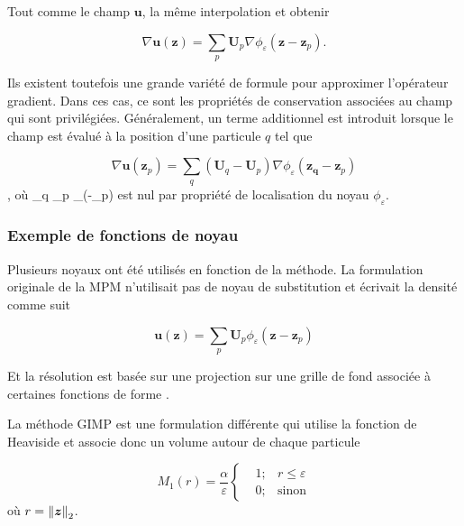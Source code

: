 Tout comme le champ $\bm u$, la même interpolation et obtenir

\begin{equation*}
    \nabla \bm{u}(\bm{z}) = \sum_p \bm{U}_p \nabla \phi_\varepsilon (\bm{z}-\bm{z}_p).
\end{equation*}

Ils existent toutefois une grande variété de formule pour approximer l'opérateur gradient. Dans ces cas, ce sont les propriétés de conservation associées au champ qui sont privilégiées.
Généralement, un terme additionnel est introduit lorsque le champ est évalué à la position d'une particule $q$ tel que

\begin{equation*}
    \nabla \bm{u}(\bm{z}_p) = \sum_q (\bm{U}_q - \bm{U}_p) \nabla \phi_\varepsilon (\bm{z_q}-\bm{z}_p)
\end{equation*}, où \sum_q _p \nabla \phi_\varepsilon (-_p) est nul par propriété de localisation du noyau $\phi_\varepsilon$.

\subsubsection{Exemple de fonctions de noyau}

Plusieurs noyaux ont été utilisés en fonction de la méthode. La formulation originale de la MPM n'utilisait pas de noyau de substitution et écrivait la densité comme suit

\begin{equation*}
    \bm{u}(\bm{z}) = \sum_p \bm{U}_p \phi_\varepsilon (\bm{z}-\bm{z}_p)
\end{equation*}

Et la résolution est basée sur une projection sur une grille de fond associée à certaines fonctions de forme \cite{sulsky_particle_1994}.

La méthode GIMP est une formulation différente qui utilise la fonction de Heaviside \cite{bardenhagen_generalized_2004} et associe donc un volume autour de chaque particule

\begin{equation*}
    M_1(r) = \frac{\alpha}{\varepsilon}\left\{\begin{aligned}
         & 1; & r \leq \varepsilon \\
         & 0; & \text{sinon}
    \end{aligned}
    \right.
\end{equation*}où $r = \left\lVert \bm{z} \right\rVert_2$.

